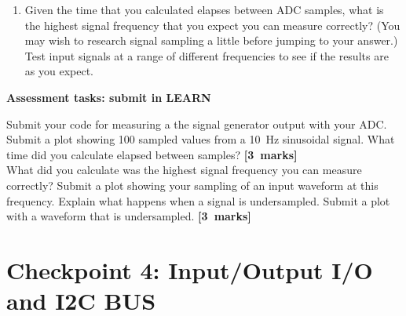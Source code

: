 \begin{enumerate}

\item [3.3.] Given the time that you calculated elapses between ADC samples, what is the highest signal frequency that you expect you can measure correctly?
(You may wish to research signal sampling a little before jumping to your answer.)
Test input signals at a range of different frequencies to see if the results are as you expect.




 

\end{enumerate}

{\bf Assessment tasks: submit in LEARN}

Submit your code for measuring a the signal generator output with your ADC.
Submit a plot showing 100 sampled values from a 10~Hz sinusoidal signal.
What time did you calculate elapsed between samples?
\hfill {\bf[3~marks]} \\

What did you calculate was the highest signal frequency you can measure correctly?
Submit a plot showing your sampling of an input waveform at this frequency.
Explain what happens when a signal is undersampled.
Submit a plot with a waveform that is undersampled.
\hfill {\bf[3~marks]} \\


\newpage
\section{Checkpoint 4: Input/Output I/O and I2C BUS}

